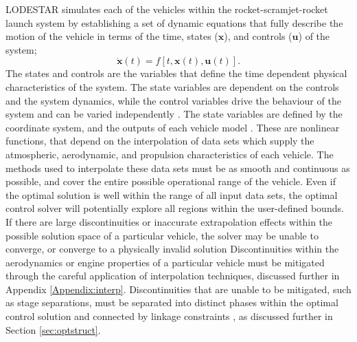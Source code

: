 LODESTAR simulates each of the vehicles within the rocket-scramjet-rocket launch system by establishing a set of dynamic equations that fully describe the motion of the vehicle in terms of the time, states ($\mathbf{x}$), and controls ($\mathbf{u}$) of the system;
\begin{equation}\label{eq:states}
\dot{\textbf{x}}(t) = f[t,\textbf{x}(t),\textbf{u}(t)].
\end{equation}
 The states and controls are the variables that define the time dependent physical characteristics of the system. The state variables are dependent on the controls and the system dynamics, while the control variables drive the behaviour of the system and can be varied independently \cite{Stryk1992}.  
The state variables are defined by the coordinate system, and the outputs of each vehicle model \cite{Rao2009}. These are nonlinear functions, that depend on the interpolation of data sets which supply the atmospheric, aerodynamic, and propulsion characteristics of each vehicle. 
The methods used to interpolate these data sets must be as smooth and continuous as possible, and cover the entire possible operational range of the vehicle. 
Even if the optimal solution is well within the range of all input data sets, the optimal control solver will potentially explore all regions within the user-defined bounds. 
If there are large discontinuities or inaccurate extrapolation effects within the possible solution space of a particular vehicle, the solver may be unable to converge, or converge to a physically invalid solution
Discontinuities within the aerodynamics or engine properties of a particular vehicle must be mitigated through the careful application of interpolation techniques, discussed further in Appendix \ref{Appendix:interp}. Discontinuities that are unable to be mitigated, such as stage separations, must be separated into distinct phases within the optimal control solution and connected by linkage constraints \cite{Betts1998}, as discussed further in Section \ref{sec:optstruct}. 

